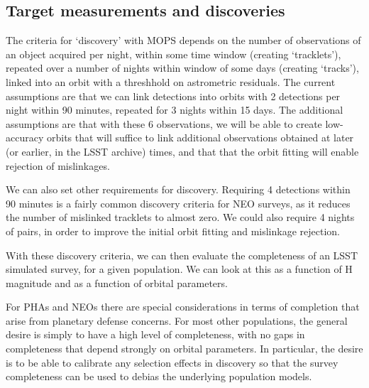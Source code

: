 
\subsection{Target measurements and discoveries}
\label{sec:\secname:targets}

The criteria for `discovery' with MOPS depends on the number
of observations of an object acquired per night, within some time
window (creating `tracklets'), repeated over a number of nights within window of some
days (creating `tracks'), linked into an orbit with a threshhold on
astrometric residuals. The current assumptions are that we can link
detections into orbits with 2 detections per night within 90 minutes,
repeated for 3 nights within 15 days. The additional assumptions are
that with these 6 observations, we will be able to create low-accuracy orbits that will suffice to link
additional observations obtained at later (or earlier, in the LSST
archive) times, and that that the orbit fitting will enable rejection
of mislinkages.

We can also set other requirements for discovery. Requiring 4
detections within 90 minutes is a fairly common discovery criteria for
NEO surveys, as it reduces the number of mislinked tracklets to almost
zero. We could also require 4 nights of pairs, in order to improve the
initial orbit fitting and mislinkage rejection.

With these discovery criteria, we can then evaluate the completeness
of an LSST simulated survey, for a given population. We can look at
this as a function of H magnitude and as a function of orbital
parameters.

For PHAs and NEOs there are special considerations in terms of
completion that arise from planetary defense concerns. For most other
populations, the general desire is simply to have a high level of
completeness, with no gaps in completeness that depend strongly on
orbital parameters. In particular, the desire is to be able to
calibrate any selection effects in discovery so that the survey completeness can
be used to debias the underlying population models.

